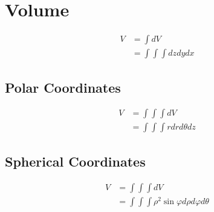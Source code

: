 \section{Volume}

  \begin{align}
    V &= \int dV \\
    &= \int \int \int dz dy dx
  \end{align}

  \subsection{Polar Coordinates}

    \begin{align}
      V &= \int \int \int dV \\
      &= \int \int \int r dr d\theta dz
    \end{align}

  \subsection{Spherical Coordinates}

    \begin{align}
      V &= \int \int \int dV \\
      &= \int \int \int \rho^{2} \sin \varphi d\rho d\varphi d\theta
    \end{align}